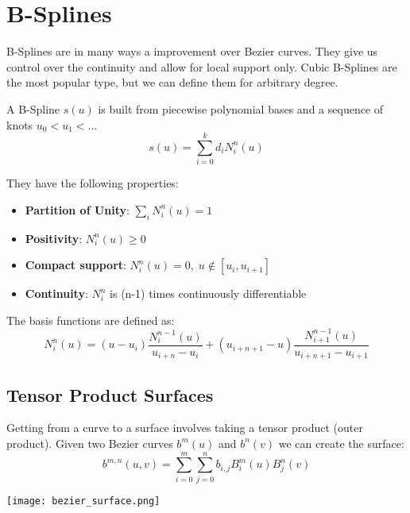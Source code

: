 \section{B-Splines}

B-Splines are in many ways a improvement over Bezier curves. They give us control over the continuity and allow for local support only. Cubic B-Splines are the most popular type, but we can define them for arbitrary degree. \medskip

A B-Spline $s(u)$ is built from piecewise polynomial bases and a sequence of knots $u_0 < u_1 < ...$
$$s(u) = \sum_{i = 0}^k d_i N^n_i(u)$$ 

They have the following properties:
\begin{itemize}
	\item \textbf{Partition of Unity}: $\sum_i N_i^n(u) = 1$
	\item \textbf{Positivity}: $N_i^n (u) \geq 0$
	\item \textbf{Compact support}: $N_i^n(u) = 0, \; u \not \in [u_i, u_{i+1}]$
	\item \textbf{Continuity}: $N_i^n$ is (n-1) times continuously differentiable
\end{itemize}

The basis functions are defined as:
$$N_i^n (u) = (u - u_i) \frac{N_i^{n-1}(u)}{u_{i+n} - u_i} + (u_{i+n+1} - u) \frac{N_{i+1}^{n-1}(u)}{u_{i+n+1} - u_{i+1}}$$
\subsection{Tensor Product Surfaces}

Getting from a curve to a surface involves taking a tensor product (outer product). Given two Bezier curves $b^m(u)$ and $b^n(v)$ we can create the surface: 
$$b^{m,n}(u,v) = \sum_{i=0}^m \sum_{j=0}^n b_{i,j} B_i^m(u) B_j^n(v)$$
\begin{center}
	\texttt{[image: bezier\_surface.png]}
\end{center}
